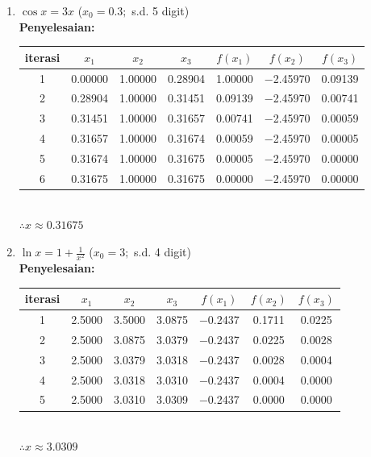 \documentclass{article}
\newcommand{\penyelesaian}{\textbf{Penyelesaian: }}
\begin{document}
\begin{enumerate}
\begin{enumerate}
        \item $\cos x = 3x$ ($x_0 = \num{0,3};$ s.d. 5 digit) \\
        \penyelesaian \\
        \begin{tabular}{|c|c|c|c|c|c|c|}
            \hline
            iterasi & $x_1$ & $x_2$ & $x_3$ & $f(x_1)$ & $f(x_2)$ & $f(x_3)$ \\
            \hline
            1 & \num{0,00000} & \num{1,00000} & \num{0,28904} & \num{1,00000} & \num{-2,45970} & \num{0,09139}\\
            2 & \num{0,28904} & \num{1,00000} & \num{0,31451} & \num{0,09139} & \num{-2,45970} & \num{0,00741}\\
            3 & \num{0,31451} & \num{1,00000} & \num{0,31657} & \num{0,00741} & \num{-2,45970} & \num{0,00059}\\
            4 & \num{0,31657} & \num{1,00000} & \num{0,31674} & \num{0,00059} & \num{-2,45970} & \num{0,00005}\\
            5 & \num{0,31674} & \num{1,00000} & \num{0,31675} & \num{0,00005} & \num{-2,45970} & \num{0,00000}\\
            6 & \num{0,31675} & \num{1,00000} & \num{0,31675} & \num{0,00000} & \num{-2,45970} & \num{0,00000}\\
             \hline
            \end{tabular}       \\
        $\therefore x \approx \num{0,31675}$     
    
        \item $\ln x = 1 + \frac{1}{x^2}$ ($x_0 = \num{3};$ s.d. 4 digit) \\
        \penyelesaian \\
        \begin{tabular}{|c|c|c|c|c|c|c|}
            \hline
            iterasi & $x_1$ & $x_2$ & $x_3$ & $f(x_1)$ & $f(x_2)$ & $f(x_3)$ \\
            \hline
            1 & \num{2,5000} & \num{3,5000} & \num{3,0875} & \num{-0,2437} & \num{0,1711} & \num{0,0225}\\
            2 & \num{2,5000} & \num{3,0875} & \num{3,0379} & \num{-0,2437} & \num{0,0225} & \num{0,0028}\\
            3 & \num{2,5000} & \num{3,0379} & \num{3,0318} & \num{-0,2437} & \num{0,0028} & \num{0,0004}\\
            4 & \num{2,5000} & \num{3,0318} & \num{3,0310} & \num{-0,2437} & \num{0,0004} & \num{0,0000}\\
            5 & \num{2,5000} & \num{3,0310} & \num{3,0309} & \num{-0,2437} & \num{0,0000} & \num{0,0000}\\
             \hline
            \end{tabular}            \\
        $\therefore x \approx \num{3,0309}$
    

\end{enumerate}
\end{enumerate}
\end{document}
